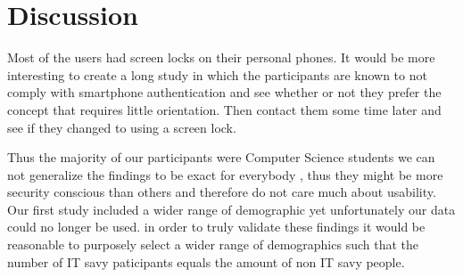 
\chapter{Discussion}\label{ch:sixth}

Most of the users had screen locks on their personal phones. It would be more interesting to create a long study in which the participants are known to not comply with smartphone authentication and see whether or not they prefer the concept that requires little orientation. Then contact them some time later and see if they changed to using a screen lock.


Thus the majority of our participants were Computer Science students we can not generalize the findings to be exact for everybody , thus they might be more security conscious than others and therefore do not care much about usability. Our first study included a wider range of demographic yet unfortunately our data could no longer be used. in order to truly validate these findings it would be reasonable to purposely select a wider range of demographics such that the number of IT savy paticipants equals the amount of non IT savy people.  